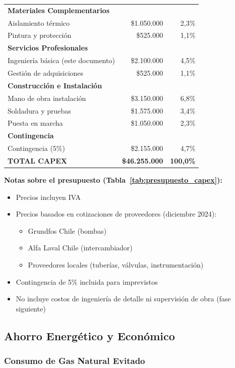 \documentclass[12pt,a4paper]{article}
\begin{document}
\begin{longtable}{p{6cm}rr}
\textbf{Materiales Complementarios} & & \\
Aislamiento térmico & \$1.050.000 & 2,3\% \\
Pintura y protección & \$525.000 & 1,1\% \\
\textbf{Servicios Profesionales} & & \\
Ingeniería básica (este documento) & \$2.100.000 & 4,5\% \\
Gestión de adquisiciones & \$525.000 & 1,1\% \\
\textbf{Construcción e Instalación} & & \\
Mano de obra instalación & \$3.150.000 & 6,8\% \\
Soldadura y pruebas & \$1.575.000 & 3,4\% \\
Puesta en marcha & \$1.050.000 & 2,3\% \\
\textbf{Contingencia} & & \\
Contingencia (5\%) & \$2.155.000 & 4,7\% \\
\midrule
\textbf{TOTAL CAPEX} & \textbf{\$46.255.000} & \textbf{100,0\%} \\
\end{longtable}

\textbf{Notas sobre el presupuesto (Tabla~\ref{tab:presupuesto_capex}):}
\begin{itemize}
    \item Precios incluyen IVA
    \item Precios basados en cotizaciones de proveedores (diciembre 2024):
    \begin{itemize}
        \item Grundfos Chile (bombas)
        \item Alfa Laval Chile (intercambiador)
        \item Proveedores locales (tuberías, válvulas, instrumentación)
    \end{itemize}
    \item Contingencia de 5\% incluida para imprevistos
    \item No incluye costos de ingeniería de detalle ni supervisión de obra (fase siguiente)
\end{itemize}

\subsection{Ahorro Energético y Económico}

\subsubsection{Consumo de Gas Natural Evitado}
\end{document}
